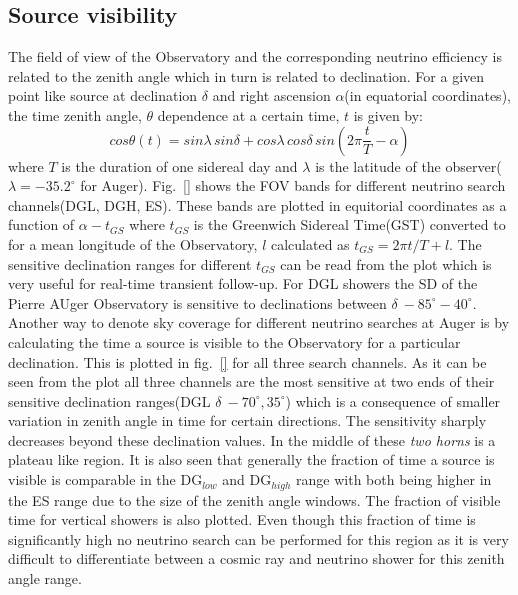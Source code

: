 \subsection{Source visibility}
\label{subsec:psource_coverage}
The field of view of the Observatory and the corresponding neutrino efficiency is related to the zenith angle which in turn is related to declination. For a given point like source at declination $\delta$ and right ascension $\alpha$(in equatorial coordinates), the time zenith angle, $\theta$ dependence at a certain time, $t$ is given by:
\begin{equation}
  cos \theta(t) = sin \lambda \,sin \delta+ cos \lambda \, cos \delta \,sin (2\pi \frac{t}{T} - \alpha)
\end{equation} 
where $T$ is the duration of one sidereal day and $\lambda$ is the latitude of the observer($\lambda = -35.2^{\circ}$ for Auger). 
Fig.~\ref{} shows the FOV bands for different neutrino search channels(DGL, DGH, ES). These bands are plotted in equitorial coordinates as a function of $\alpha - t _{GS}$ where $t_{GS}$ is the Greenwich Sidereal Time(GST) converted to for a mean longitude of the Observatory, $l$ calculated as $t_{GS}= 2\pi t/T + l$. The sensitive declination ranges for different $t_{GS}$ can be read from the plot which is very useful for real-time transient follow-up. For DGL showers the SD of the Pierre AUger Observatory is sensitive to declinations between $\delta ~ -85^{\circ} - 40^{\circ}$. Another way to denote sky coverage for different neutrino searches at Auger is by calculating the time a source is visible to the Observatory for a particular declination. This is plotted in fig.~\ref{} for all three search channels. As it can be seen from the plot all three channels are the most sensitive at two ends of their sensitive declination ranges(DGL $\delta ~ -70^{\circ}, 35^{\circ}$) which is a consequence of smaller variation in zenith angle in time for certain directions. The sensitivity sharply decreases beyond these declination values. In the middle of these \textit{two horns} is a plateau like region. It is also seen that generally the fraction of time a source is visible is comparable in the DG$_{low}$ and DG$_{high}$ range with both being higher in the ES range due to the size of the zenith angle windows. The fraction of visible time for vertical showers is also plotted. Even though this fraction of time is significantly high no neutrino search can be performed for this region as it is very difficult to differentiate between a cosmic ray and neutrino shower for this zenith angle range. 

